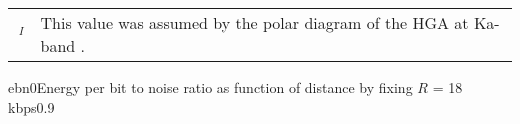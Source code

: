 \vspace{2mm}
\small
\renewcommand{\arraystretch}{1.1}
\begin{tabularx}{\linewidth}{lX}
    $\,^{I}$ & This value was assumed by the polar diagram of the HGA at Ka-band \cite{juno_telecommunication}.
\end{tabularx}

{ebn0}{Energy per bit to noise ratio as function of distance by fixing $R$ = 18 kbps}{0.9}

    
